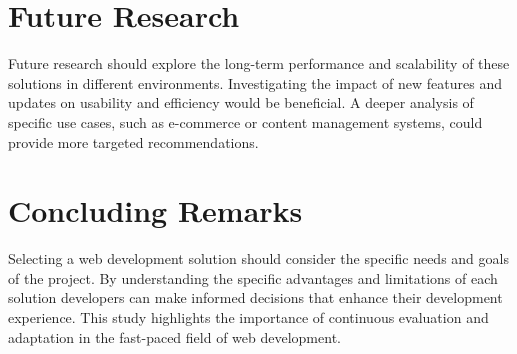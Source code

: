 \section{Future Research}

Future research should explore the long-term performance and scalability of these solutions in different environments. Investigating the impact of new features and updates on usability and efficiency would be beneficial. A deeper analysis of specific use cases, such as e-commerce or content management systems, could provide more targeted recommendations.

\section{Concluding Remarks}

Selecting a web development solution should consider the specific needs and goals of the project. By understanding the specific advantages and limitations of each solution developers can make informed decisions that enhance their development experience. This study highlights the importance of continuous evaluation and adaptation in the fast-paced field of web development.